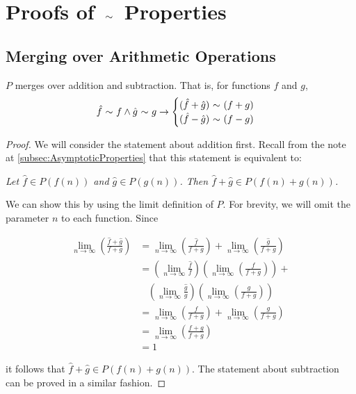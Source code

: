 \appendix
\appendixpage

\section{Proofs of $\ \mathtt{\sim}\ $ Properties}

\subsection{Merging over Arithmetic Operations}
\label{pf:MergingOverArithmetic}

\begin{theorem}
	$P$ merges over addition and subtraction. That is, for functions $f$ and $g$,
	\begin{align*}
	\hat{f} \ \mathtt{\sim}\  f \land \hat{g} \ \mathtt{\sim}\  g \rightarrow \begin{cases}
	(\hat{f} + \hat{g}) \ \mathtt{\sim}\  (f + g)\\
	(\hat{f} - \hat{g}) \ \mathtt{\sim}\  (f - g)
	\end{cases}
	\end{align*}
\end{theorem}

\begin{proof}
	We will consider the statement about addition first. Recall from the note at \ref{subsec:AsymptoticProperties} that this statement is equivalent to:
	
	\textit{Let $\hat{f} \in P(f(n))$ and $\hat{g} \in P(g(n))$. Then $\hat{f} + \hat{g} \in P(f(n) + g(n))$.}
	
	We can show this by using the limit definition of $P$. For brevity, we will omit the parameter $n$ to each function. Since
	
	\begin{align*}
	\lim_{n \to \infty} \left( \frac{\hat{f} + \hat{g}}{f + g} \right) &= \lim_{n \to \infty} \left( \frac{\hat{f}}{f + g} \right) + \lim_{n \to \infty} \left( \frac{\hat{g}}{f + g} \right)\\
	&= \left( \lim_{n \to \infty} \frac{\hat{f}}{f} \right) \left( \lim_{n \to \infty} \left( \frac{f}{f + g} \right) \right) +\\
	&\ \ \ \ \left( \lim_{n \to \infty} \frac{\hat{g}}{g} \right) \left( \lim_{n \to \infty} \left( \frac{g}{f + g} \right) \right)\\
	&= \lim_{n \to \infty} \left( \frac{f}{f + g} \right) + \lim_{n \to \infty} \left( \frac{g}{f + g} \right)\\
	&= \lim_{n \to \infty} \left( \frac{f + g}{f + g} \right)\\
	&= 1
	\end{align*}
	
	it follows that $\hat{f} + \hat{g} \in P(f(n) + g(n))$. The statement about subtraction can be proved in a similar fashion.
\end{proof}

